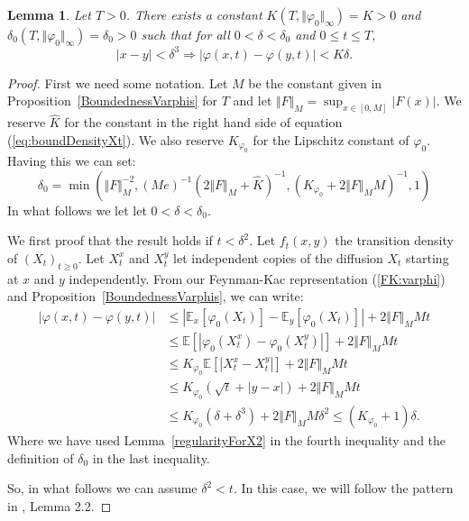 \documentclass[a4paper,12pt]{article}
\newtheorem{lemma}[theorem]{Lemma}
\newcommand{\EE}{\mathbb{E}}
\newcommand{\1}{{\bf {1}}}
\begin{document}
\begin{lemma} \label{ContinuityVarphi}
Let $T>0$. There exists a constant $K(T, \Vert \varphi_0\Vert_\infty) = K>0$ and $\delta_0(T, \Vert \varphi_0\Vert_\infty) = \delta_0>0$ such that for all $0 < \delta<\delta_0$ and $0 \leq t \leq T$,
\[  |x-y|<\delta^3 \Rightarrow |\varphi(x,t)-\varphi(y,t)|< K\delta.\]
\end{lemma}
\begin{proof}
First we need some notation. Let $M$ be the constant given in Proposition~\ref{BoundednessVarphis} for $T$ and let $\Vert F \Vert_{M} = \sup_{x \in [0,M]} |F(x)|$. We reserve $\widehat{K}$ for the constant in the right hand side of equation (\ref{eq:boundDensityXt}). We also reserve $K_{\varphi_0}$ for the Lipschitz constant of $\varphi_0$. Having this we can set:
\[ \delta_0=\min(\Vert F \Vert_M^{-2},(M e)^{-1}(2\Vert F \Vert_{M}+ \widehat{K})^{-1}, (K_{\varphi_0} + 2 \Vert F \Vert_M M)^{-1} ,  1)\]
In what follows we let let $0< \delta<\delta_0$. 



We first proof that the result holds if $t < \delta^2$. Let $f_t(x,y)$ the transition density of $(X_t)_{t \geq 0}$.  Let $X_t^x$ and $X_t^y$ let independent copies of the diffusion $X_t$ starting at $x$ and $y$ independently. From our Feynman-Kac representation (\ref{FK:varphi}) and Proposition~\ref{BoundednessVarphis}, we can write:
\begin{align*}
|\varphi(x,t)- \varphi(y,t)| &\leq |\EE_x[\varphi_0(X_t)]-\EE_y[\varphi_0(X_t)]| + 2 \Vert F \Vert_M M t \\ & \leq \EE[|\varphi_0(X_t^x)-\varphi_0(X_t^y)|] + 2 \Vert F \Vert_M M t  \\ &\leq K_{\varphi_0}  \EE[|X_t^x-X_t^y|] + 2 \Vert F \Vert_M M t \\ & \leq K_{\varphi_0}  (\sqrt{t} + |y-x|) + 2 \Vert F \Vert_M M t \\ & \leq K_{\varphi_0} (\delta + \delta^3) + 2 \Vert F \Vert_M M \delta^2 \leq (K_{\varphi_0} +1)\delta.
\end{align*}
Where we have used Lemma~\ref{regularityForX2} in the fourth inequality and the definition of $\delta_0$ in the last inequality.

So, in what follows we can assume $\delta^2<t$. In this case, we will follow the pattern in \cite{sarahfkpp}, Lemma 2.2. 



\end{proof}
\end{document}
